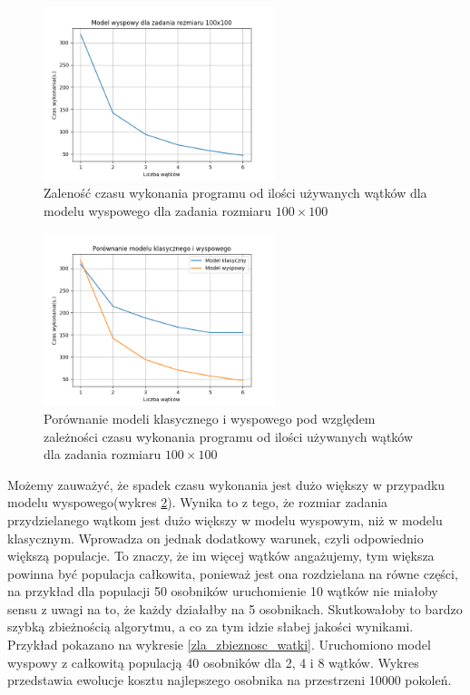 \begin{figure}[H]
    \centering        
    \includegraphics[width=0.6\textwidth]{img/plot_island_threads_100x100.png}
    \caption{Zaleność czasu wykonania programu od ilości używanych wątków dla modelu wyspowego dla zadania rozmiaru $100\times100$}
    \label{threads_island_100x100}
\end{figure}

\begin{figure}[H]
    \centering        
    \includegraphics[width=0.6\textwidth]{img/plot_compare_threads_100x100.png}
    \caption{Porównanie modeli klasycznego i wyspowego pod względem zależności czasu wykonania programu od ilości używanych wątków dla zadania 
    rozmiaru $100\times100$}
    \label{threads_comparsion_100x100}
\end{figure}

Możemy zauważyć, że spadek czasu wykonania jest dużo większy w przypadku modelu wyspowego(wykres \ref{threads_comparsion_100x100}). 
Wynika to z tego, że rozmiar zadania przydzielanego wątkom 
jest dużo większy w modelu wyspowym, niż w modelu klasycznym. Wprowadza on jednak dodatkowy warunek, czyli odpowiednio większą populacje. To znaczy, że 
im więcej wątków angażujemy, tym większa powinna być populacja całkowita, ponieważ jest ona rozdzielana na równe części, na przykład dla populacji 50 
osobników uruchomienie 10 wątków nie miałoby sensu z uwagi na to, że każdy działałby na 5 osobnikach. Skutkowałoby to bardzo szybką zbieżnością algorytmu, 
a co za tym idzie słabej jakości wynikami. Przykład pokazano na wykresie \ref{zla_zbieznosc_watki}. Uruchomiono model wyspowy z całkowitą populacją 40 osobników 
dla 2, 4 i 8 wątków. Wykres przedstawia ewolucje kosztu najlepszego osobnika na przestrzeni 10000 pokoleń.

